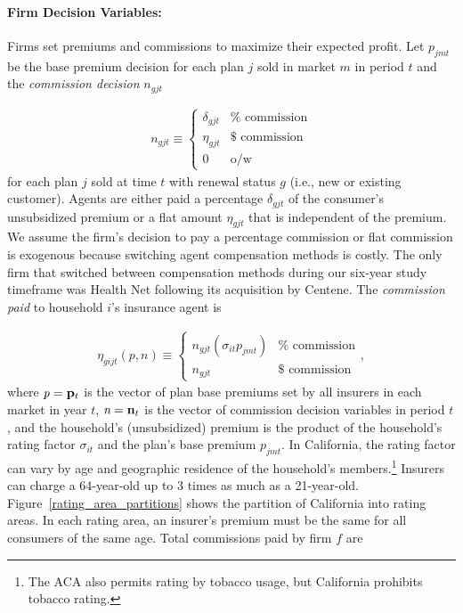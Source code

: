 \documentclass[12pt]{article}
\begin{document}
\paragraph{Firm Decision Variables:}
Firms set premiums and commissions to maximize their expected profit.  Let $p_{jmt}$ be the base premium decision for each plan $j$ sold in market $m$ in period $t$ and the \textit{commission decision} $n_{gjt}$ 

\vspace{-0.4in}		
\singlespacing
\begin{eqnarray*}
    n_{gjt}  \equiv 
    \begin{cases} 
	    \delta_{gjt} & \mathrm{\% \,\, commission} \\		
	    \eta_{gjt} & \mathrm{\$ \,\, commission} \\
	    0 & \mathrm{o/w}
    \end{cases}
\end{eqnarray*}		   
\doublespacing
\noindent for each plan $j$ sold at time $t$ with renewal status $g$ (i.e., new or existing customer). Agents are either paid a percentage $\delta_{gjt}$  of the consumer's unsubsidized premium  or a flat amount $\eta_{gjt}$ that is independent of the premium.  We assume the firm's decision to pay a percentage commission or flat commission is exogenous because switching agent compensation methods is costly.  The only firm that switched between compensation methods during our six-year study timeframe was Health Net following its acquisition by Centene. The \textit{commission paid} to household $i$'s insurance agent is

\vspace{-0.4in}		
\singlespacing			
\begin{eqnarray*}
	\eta_{gijt}(\textit{p},\textit{n})  \equiv 
	\begin{cases} 
		n_{gjt} \left(\sigma_{it}p_{jmt}\right) & \mathrm{\% \,\, commission} \\		
		n_{gjt} & \mathrm{\$ \,\, commission}
    \end{cases},
\end{eqnarray*}
\doublespacing
\noindent where $\textit{p} = {\bf p}_t$ is the vector of plan base premiums set by all insurers in each market in year $t$, $\textit{n} = {\bf n}_t$ is the vector of commission decision variables in period $t$, and the household's (unsubsidized) premium is the product of the household's rating factor $\sigma_{it}$  and the plan's base premium $p_{jmt}$. In California, the rating factor can vary by age and geographic residence of the household's members.\footnote{The ACA also permits rating by tobacco usage, but California prohibits tobacco rating.}  Insurers can charge a 64-year-old up to 3 times as much as a 21-year-old. Figure~\ref{rating_area_partitions} shows the partition of California into rating areas.  In each rating area,  an insurer's premium must be the same for all consumers of the same age. Total commissions paid by firm $f$  are		
	
\end{document}
